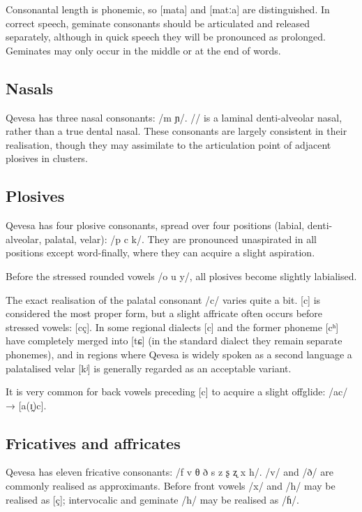 \documentclass[grammar]{subfiles}
\begin{document}
Consonantal length is phonemic, so [mata] and [matːa] are distinguished.  In
correct speech, geminate consonants should be articulated and released
separately, although in quick speech they will be pronounced as prolonged.
Geminates may only occur in the middle or at the end of words.


\subsection{Nasals}
\label{ssec:nasals}

Qevesa has three nasal consonants: /m  ɲ/.  // is a laminal
denti-alveolar nasal, rather than a true dental nasal.  These consonants are
largely consistent in their realisation, though they may assimilate to the
articulation point of adjacent plosives in clusters. 


\subsection{Plosives}
\label{ssec:plosives}

Qevesa has four plosive consonants, spread over four positions (labial,
denti-alveolar, palatal, velar): /p  c k/. They are pronounced
unaspirated in all positions except word-finally, where they can acquire
a slight aspiration.

Before the stressed rounded vowels /o u y/, all plosives become slightly
labialised.

The exact realisation of the palatal consonant /c/ varies quite a bit. [c] is
considered the most proper form, but a slight affricate often occurs
before stressed vowels: [c\sup ç]. In some regional dialects [c] and the former
phoneme [cʰ] have completely merged into [tɕ] (in the standard dialect they
remain separate phonemes), and in regions where Qevesa is widely spoken as a
second language a palatalised velar [kʲ] is generally regarded as an acceptable
variant.

It is very common for back vowels preceding [c] to acquire a slight offglide:
/ac/ → [a(ɪ̯)c].


\subsection{Fricatives and affricates}
\label{ssec:fricatives}

Qevesa has eleven fricative consonants: /f v θ ð s z ʂ ʐ x h/.  /v/ and /ð/ are
commonly realised as approximants.  Before front vowels /x/ and /h/ may be realised
as [ç]; intervocalic and geminate /h/ may be realised as /ɦ/. 
\end{document}
